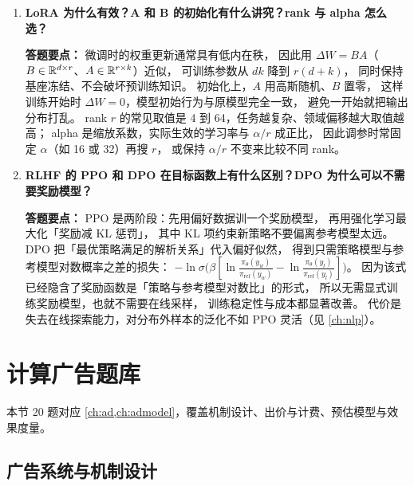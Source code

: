 \begin{interview}[题库与答题要点]
\begin{enumerate}[label=]
  \item[\textcolor{VioletDeep}{\textbf{Q57.}}] \textbf{LoRA 为什么有效？$\bm{A}$ 和 $\bm{B}$ 的初始化有什么讲究？rank 与 alpha 怎么选？}
\par\smallskip\noindent\textcolor{VioletDeep}{\textbf{答题要点：}}
微调时的权重更新通常具有低内在秩，
因此用 $\Delta W = BA$（$B\in\mathbb{R}^{d\times r}$、$A\in\mathbb{R}^{r\times k}$）近似，
可训练参数从 $dk$ 降到 $r(d+k)$，
同时保持基座冻结、不会破坏预训练知识。
初始化上，$A$ 用高斯随机、$B$ 置零，
这样训练开始时 $\Delta W = 0$，模型初始行为与原模型完全一致，
避免一开始就把输出分布打乱。
rank $r$ 的常见取值是 4 到 64，任务越复杂、领域偏移越大取值越高；
alpha 是缩放系数，实际生效的学习率与 $\alpha/r$ 成正比，
因此调参时常固定 $\alpha$（如 16 或 32）再搜 $r$，
或保持 $\alpha/r$ 不变来比较不同 rank。

  \item[\textcolor{VioletDeep}{\textbf{Q58.}}] \textbf{RLHF 的 PPO 和 DPO 在目标函数上有什么区别？DPO 为什么可以不需要奖励模型？}
\par\smallskip\noindent\textcolor{VioletDeep}{\textbf{答题要点：}}
PPO 是两阶段：先用偏好数据训一个奖励模型，
再用强化学习最大化「奖励减 KL 惩罚」，
其中 KL 项约束新策略不要偏离参考模型太远。
DPO 把「最优策略满足的解析关系」代入偏好似然，
得到只需策略模型与参考模型对数概率之差的损失：
$-\ln\sigma\big(\beta[\ln\frac{\pi_\theta(y_w)}{\pi_{\text{ref}}(y_w)} - \ln\frac{\pi_\theta(y_l)}{\pi_{\text{ref}}(y_l)}]\big)$。
因为该式已经隐含了奖励函数是「策略与参考模型对数比」的形式，
所以无需显式训练奖励模型，也就不需要在线采样，
训练稳定性与成本都显著改善。
代价是失去在线探索能力，对分布外样本的泛化不如 PPO 灵活（见 \cref{ch:nlp}）。

\end{enumerate}

\end{interview}

\section{计算广告题库}

本节 20 题对应 \cref{ch:ad,ch:admodel}，覆盖机制设计、出价与计费、预估模型与效果度量。

\subsection{广告系统与机制设计}

